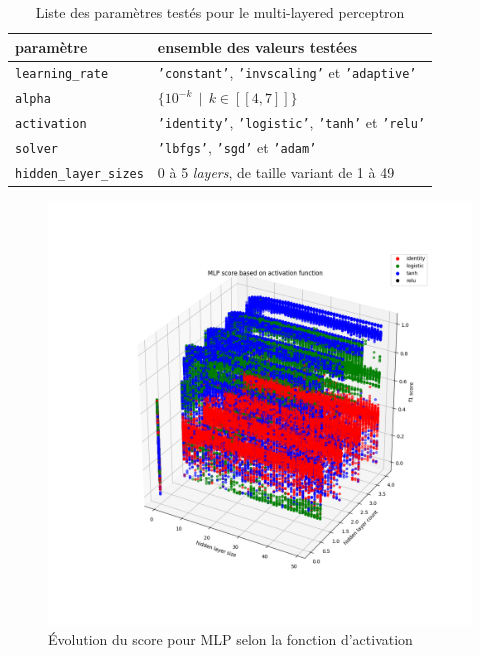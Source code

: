 \documentclass[a4paper]{report}
\begin{document}
\begin{table}[h]
\centering
\begin{tabular}{ll}
paramètre & ensemble des valeurs testées \\
\hline
\texttt{learning\_rate} & \texttt{'constant'}, \texttt{'invscaling'} et \texttt{'adaptive'}\\
\texttt{alpha} & $\{10^{-k} \>\> | \>\> k \in [\![4, 7]\!] \}$ \\
\texttt{activation} & \texttt{'identity'}, \texttt{'logistic'}, \texttt{'tanh'} et \texttt{'relu'} \\
\texttt{solver} & \texttt{'lbfgs'}, \texttt{'sgd'} et \texttt{'adam'}\\
\texttt{hidden\_layer\_sizes} & 0 à 5 \emph{layers}, de taille variant de 1 à 49\\
\end{tabular}
\caption{Liste des paramètres testés pour le multi-layered perceptron\label{params_mlp}}
\end{table}

\begin{figure}
\centering
\includegraphics[width=\textwidth]{img/mlp_activation.png}
\caption{Évolution du score pour MLP selon la fonction d'activation\label{mlp_activation}}
\end{figure}
\end{document}

